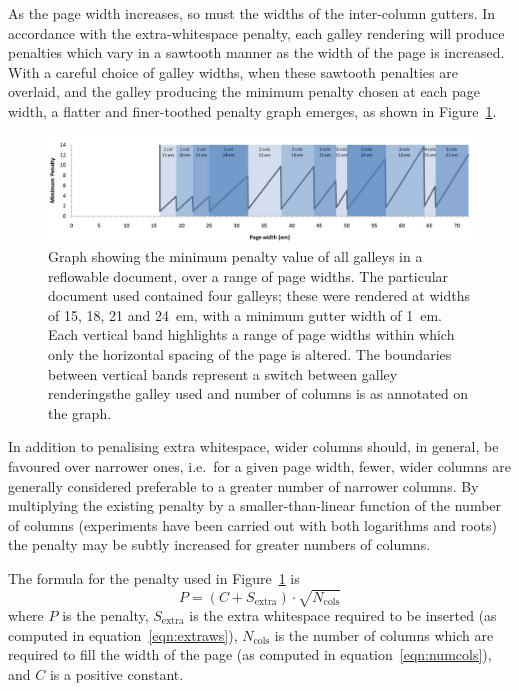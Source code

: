 As the page width increases, so must the widths of the inter-column gutters. In accordance with the extra-whitespace penalty, each galley rendering will produce penalties which vary in a sawtooth manner as the width of the page is increased. With a careful choice of galley widths, when these sawtooth penalties are overlaid, and the galley producing the minimum penalty chosen at each page width, a flatter and finer-toothed penalty graph emerges, as shown in Figure~\ref{fig:penaltygraph}.

\begin{figure}
 \includegraphics[width=\textwidth]{gfx/graph-em}
 \caption[Graph of minimum penalty values]{Graph showing the minimum penalty value of all galleys in a reflowable document, over a range of page widths. The particular document used contained four galleys; these were rendered at widths of 15, 18, 21 and 24~em, with a minimum gutter width of 1~em. Each vertical band highlights a range of page widths within which only the horizontal spacing of the page is altered. The boundaries between vertical bands represent a switch between galley renderings\ed{}the galley used and number of columns is as annotated on the graph.}
 \label{fig:penaltygraph}
\end{figure}

In addition to penalising extra whitespace, wider columns should, in general, be favoured over narrower ones, i.e.~for a given page width, fewer, wider columns are generally considered preferable to a greater number of narrower columns. By multiplying the existing penalty by a smaller-than-linear function of the number of columns (experiments have been carried out with both logarithms and roots) the penalty may be subtly increased for greater numbers of columns.

The formula for the penalty used in Figure~\ref{fig:penaltygraph} is \begin{equation}P = (C + S_\text{extra})\cdot\sqrt{N_\text{cols}}\end{equation} where $P$ is the penalty, $S_\text{extra}$ is the extra whitespace required to be inserted (as computed in equation~\ref{eqn:extraws}), $N_\text{cols}$ is the number of columns which are required to fill the width of the page (as computed in equation~\ref{eqn:numcols}), and $C$ is a positive constant.

